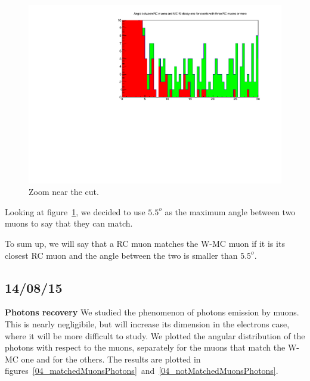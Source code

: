 \begin{figure} [htp]
\centering
\includegraphics[scale=0.7]{04_muonsMatchAngleCut.pdf}
\caption{Zoom near the cut.}
\label{04_muonsMatchAngleCut}
\end{figure}

Looking at figure~\ref{04_muonsMatchAngleCut}, we decided to use $5.5^o$ as the maximum angle between two muons to say that they can match.

To sum up, we will say that a RC muon matches the W-MC muon if it is its closest RC muon and the angle between the two is smaller than $5.5^o$.

\subsection{14/08/15}

\textbf{Photons recovery}
We studied the phenomenon of photons emission by muons. This is nearly negligibile, but will increase its dimension in the electrons case, where it will be more difficult to study. We plotted the angular distribution of the photons with respect to the muons, separately for the muons that match the W-MC one and for the others. The results are plotted in figures~\ref{04_matchedMuonsPhotons}~and~\ref{04_notMatchedMuonsPhotons}.

